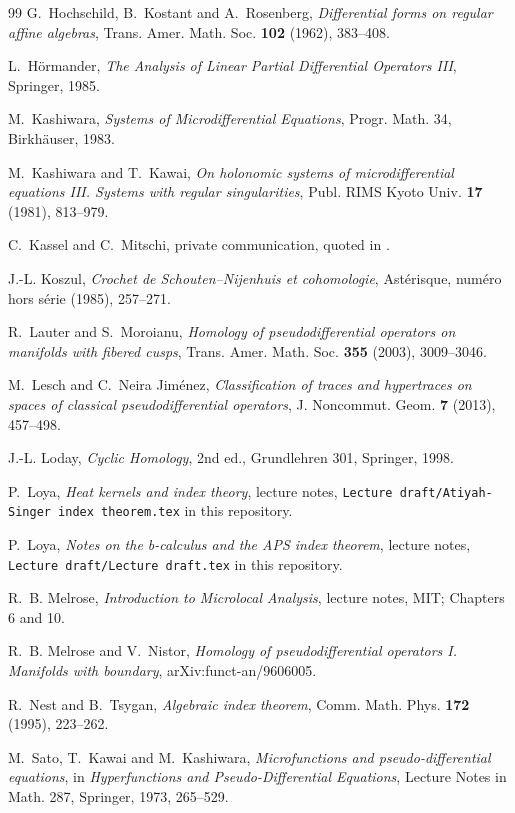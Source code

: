 \documentclass[11pt,oneside,reqno]{article}
\theoremstyle{plain}
\theoremstyle{definition}
\theoremstyle{remark}
\begin{document}
\begin{thebibliography}{99}
G.~Hochschild, B.~Kostant and A.~Rosenberg,
\emph{Differential forms on regular affine algebras},
Trans. Amer. Math. Soc. \textbf{102} (1962), 383--408.

L.~Hörmander,
\emph{The Analysis of Linear Partial Differential Operators III},
Springer, 1985.

M.~Kashiwara,
\emph{Systems of Microdifferential Equations}, Progr. Math. 34, Birkhäuser, 1983.

M.~Kashiwara and T.~Kawai,
\emph{On holonomic systems of microdifferential equations III. Systems with
regular singularities},
Publ. RIMS Kyoto Univ. \textbf{17} (1981), 813--979.

C.~Kassel and C.~Mitschi, private communication, quoted in \cite{BG}.

J.-L. Koszul,
\emph{Crochet de Schouten--Nijenhuis et cohomologie},
Astérisque, numéro hors série (1985), 257--271.

R.~Lauter and S.~Moroianu,
\emph{Homology of pseudodifferential operators on manifolds with fibered cusps},
Trans. Amer. Math. Soc. \textbf{355} (2003), 3009--3046.

M.~Lesch and C.~Neira Jiménez,
\emph{Classification of traces and hypertraces on spaces of classical
pseudodifferential operators},
J. Noncommut. Geom. \textbf{7} (2013), 457--498.

J.-L. Loday,
\emph{Cyclic Homology}, 2nd ed., Grundlehren 301, Springer, 1998.

P.~Loya,
\emph{Heat kernels and index theory}, lecture notes,
\texttt{Lecture draft/Atiyah-Singer index theorem.tex} in this repository.

P.~Loya,
\emph{Notes on the b-calculus and the APS index theorem}, lecture notes,
\texttt{Lecture draft/Lecture draft.tex} in this repository.

R.~B. Melrose,
\emph{Introduction to Microlocal Analysis}, lecture notes, MIT; Chapters 6 and 10.

R.~B. Melrose and V.~Nistor,
\emph{Homology of pseudodifferential operators I. Manifolds with boundary},
arXiv:funct-an/9606005.

R.~Nest and B.~Tsygan,
\emph{Algebraic index theorem},
Comm. Math. Phys. \textbf{172} (1995), 223--262.

M.~Sato, T.~Kawai and M.~Kashiwara,
\emph{Microfunctions and pseudo-differential equations},
in \emph{Hyperfunctions and Pseudo-Differential Equations}, Lecture Notes in Math.
287, Springer, 1973, 265--529.


\end{thebibliography}
\end{document}
